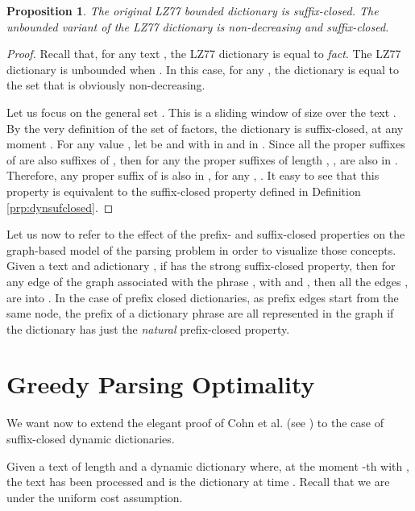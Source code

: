 \documentclass[12pt]{article}
\theoremstyle{plain}
\newtheorem{proposition}[theorem]{Proposition}
\theoremstyle{definition}
\theoremstyle{remark}
\begin{document}
\begin{proposition}\label{pro:lz77strong}
The original LZ77 bounded dictionary is suffix-closed. 
The unbounded variant of the LZ77 dictionary is non-decreasing and suffix-closed.
\end{proposition}

\begin{proof}
Recall that, for any text , the LZ77 dictionary is equal to  \emph{fact}.
The LZ77 dictionary is unbounded when . In this case, for any , the dictionary  is equal to the set  that is obviously non-decreasing.

Let us focus on the general set . 
This is a sliding window of size  over the text .
By the very definition of the set of factors, the dictionary  is suffix-closed, at any moment .
For any value , let be  and  with  in  and  in . Since all the proper suffixes of  are also suffixes of , then for any  the proper suffixes  of length , , are also in . 
Therefore, any proper suffix of  is also in , for any , .
It easy to see that this property is equivalent to the suffix-closed property defined in Definition \ref{prp:dynsufclosed}.
\end{proof} 




Let us now to refer to the effect of the prefix- and suffix-closed properties on the graph-based model of the parsing problem in order to visualize those concepts. 
Given a text  and adictionary , if  has the strong suffix-closed property, then for any edge  of the graph  associated with the phrase , with  and , then all the edges ,  are into . 
In the case of prefix closed dictionaries, as prefix edges start from the same node, the prefix of a dictionary phrase are all represented in the graph if the dictionary has just the \emph{natural} prefix-closed property.


\section{Greedy Parsing Optimality}\label{sec:optimality}

We want now to extend 
the elegant proof of Cohn et al. (see \cite{DBLP:conf/dcc/CohnK96}) to the case of suffix-closed dynamic dictionaries.




Given a text  of length  and a dynamic dictionary  where, at the moment -th with , the text  has been processed and  is the dictionary  at time . Recall that we are under the uniform cost assumption.
\end{document}
